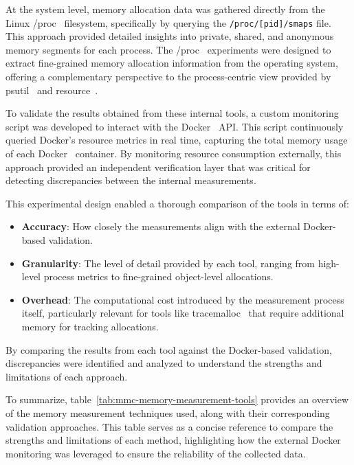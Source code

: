 At the system level, memory allocation data was gathered directly from the Linux /proc~\cite{procfs} filesystem, specifically by querying the \texttt{/proc/[pid]/smaps} file.
This approach provided detailed insights into private, shared, and anonymous memory segments for each process.
The /proc~\cite{procfs} experiments were designed to extract fine-grained memory allocation information from the operating system, offering a complementary perspective to the process-centric view provided by psutil~\cite{psutil} and resource~\cite{importlib_resources}.

To validate the results obtained from these internal tools, a custom monitoring script was developed to interact with the Docker~\cite{docker} API.
This script continuously queried Docker’s resource metrics in real time, capturing the total memory usage of each Docker~\cite{docker} container.
By monitoring resource consumption externally, this approach provided an independent verification layer that was critical for detecting discrepancies between the internal measurements.

This experimental design enabled a thorough comparison of the tools in terms of:

\begin{itemize}
    \item \textbf{Accuracy}:
    How closely the measurements align with the external Docker-based validation.

    \item \textbf{Granularity}:
    The level of detail provided by each tool, ranging from high-level process metrics to fine-grained object-level allocations.

    \item \textbf{Overhead}:
    The computational cost introduced by the measurement process itself, particularly relevant for tools like tracemalloc~\cite{tracemalloc} that require additional memory for tracking allocations.
\end{itemize}

By comparing the results from each tool against the Docker-based validation, discrepancies were identified and analyzed to understand the strengths and limitations of each approach.

To summarize, table~\ref{tab:mmc-memory-measurement-tools} provides an overview of the memory measurement techniques used, along with their corresponding validation approaches.
This table serves as a concise reference to compare the strengths and limitations of each method, highlighting how the external Docker monitoring was leveraged to ensure the reliability of the collected data.

